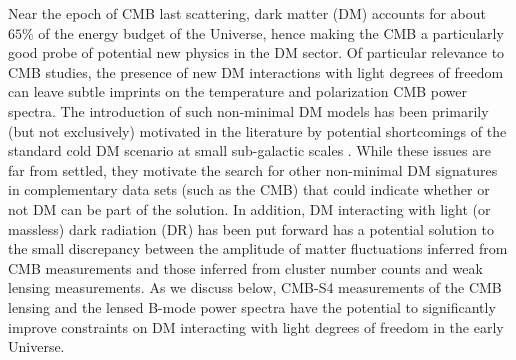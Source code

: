 Near the epoch of CMB last scattering, dark matter (DM) accounts for about $65\%$ of the energy budget of the Universe, hence making the CMB a particularly good probe of potential new physics in the DM sector. Of particular relevance to CMB studies, the presence of new DM interactions with light degrees of freedom \cite{Goldberg:1986nk,1992ApJ...398...43C,1992ApJ...398..407G,1994ApJ...431...41M,1995ApJ...452..495D,AtrioBarandela:1996ur,Green:2005fa,Profumo:2006bv,Bringmann:2009vf,Boehm:2001hm,Mangano:2006mp,Serra:2009uu,McDermott:2010pa,Aarssen:2012fx,Wilkinson:2013kia,Wilkinson:2014ksa,Dvorkin:2013cea,Boehm:2014vja,Escudero:2015yka,Foot:2004pa,Ackerman:2008gi, ArkaniHamed:2008qn,Feng:2009mn,Kaplan:2009de,Behbahani:2010xa,Kaplan:2011yj,Aarssen:2012fx,Cline:2012is,Hooper:2012cw,Das:2012aa,Cyr-Racine:2013ab,Diamanti:2012tg,Baldi:2012ua,Fan:2013yva,Fan:2013tia,McCullough:2013jma,Cyr-Racine:2013fsa,Cline:2013pca,Cline:2013zca,Bringmann:2013vra,Chu:2014lja,Archidiacono:2014nda,Randall:2014kta,Buen-Abad:2015ova,Lesgourgues:2015wza,Choquette:2015mca} can leave subtle imprints on the temperature and polarization CMB power spectra. The introduction of such non-minimal DM models has been primarily (but not exclusively) motivated in the literature by potential shortcomings of the standard cold DM scenario at small sub-galactic scales \cite{deBlok:1997zlw,Klypin:1999uc,Moore:1999aa,Zavala:2009ms,Oh:2010ea,BoylanKolchin:2011de,Papastergis:2011xe,Walker:2011zu,Pawlowski01112013,Klypin:2014ira,Oman:2015xda,Papastergis2015de}. While these issues are far from settled, they motivate the search for other non-minimal DM signatures in complementary data sets (such as the CMB) that could indicate whether or not DM can be part of the solution. In addition, DM interacting with light (or massless) dark radiation (DR) has been put forward \cite{Buen-Abad:2015ova,Lesgourgues:2015wza} has a potential solution to the small discrepancy between the amplitude of matter fluctuations inferred from CMB measurements and those inferred from cluster number counts and weak lensing measurements. As we discuss below, CMB-S4 measurements of the CMB lensing and the lensed B-mode power spectra have the potential to significantly improve constraints on DM interacting with light degrees of freedom in the early Universe.

